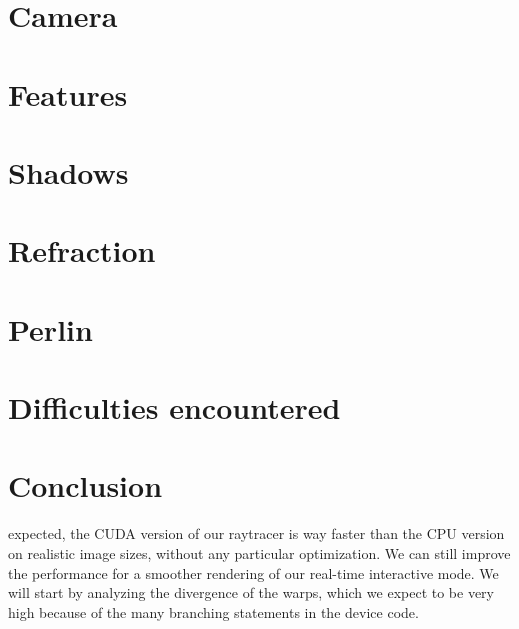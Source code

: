 \documentclass[a4paper,12pt,journal,twoside,compsoc]{PPIEEEtran}
\begin{document}
\section{Camera}

\section{Features}

\section{Shadows}

\section{Refraction}

\section{Perlin}

\section{Difficulties encountered}

\section{Conclusion}
\label{concl}
 expected, the CUDA version of our raytracer is way faster than the CPU version on realistic image sizes, without any particular optimization.  We can still improve the performance for a smoother rendering of our real-time interactive mode.  We will start by analyzing the divergence of the warps, which we expect to be very high because of the many branching statements in the device code.




\newpage
\onecolumn
\end{document}
